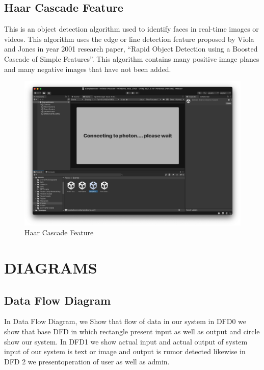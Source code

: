\documentclass[12pt]{report}
\begin{document}
\subsection{ Haar Cascade Feature}
\hspace{1.7cm}This is an object detection algorithm used to identify faces in real-time images or videos. 
This algorithm uses the edge or line detection feature proposed by Viola and Jones in year 
2001 research paper, “Rapid Object Detection using a Boosted Cascade of Simple 
Features”. This algorithm contains many positive image planes and many negative images 
that have not been added.
\vspace{1.5cm}
\begin{figure}[h]
\centering
\includegraphics[scale=0.6]{Haar.png}
\caption{Haar Cascade Feature}
\label{Haar Cascade Feature}
\end{figure}
\clearpage

\vspace{4cm}
\raggedright
\centering
\section{DIAGRAMS}
\justifying
\setlength{\parindent}{4em}
\setlength{\parskip}{0.5em}
\renewcommand{\baselinestretch}{1.5}
\normalsize
\subsection{Data Flow Diagram}
In Data Flow Diagram, we Show that flow of data in our system in DFD0 we show that 
base DFD in which rectangle present input as well as output and circle show our system. 
In DFD1 we show actual input and actual output of system input of our system is text or 
image and output is rumor detected likewise in DFD 2 we presentoperation of user as well
as admin.
\end{document}
